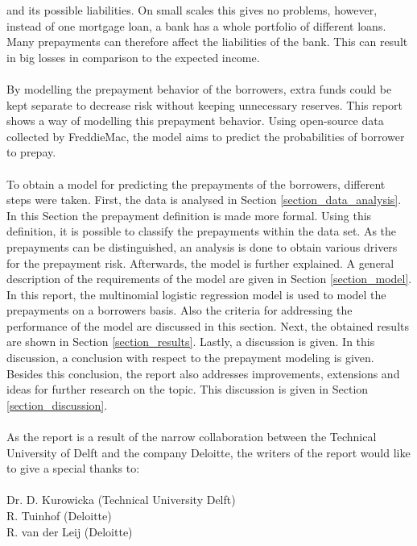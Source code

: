 and its possible liabilities. %
On small scales this gives no problems, however, instead of one 
mortgage loan, a bank has a whole portfolio of different loans. 
Many prepayments can therefore affect the liabilities of the bank. This 
can result in big losses in comparison to the expected income.  
\\\\
By modelling the prepayment behavior of the borrowers, extra funds could be 
kept separate to decrease risk without keeping unnecessary 
reserves. 
This report shows a way of modelling this prepayment behavior. 
Using open-source data collected by FreddieMac, the model aims to predict 
the probabilities of borrower to prepay. 
\\\\
To obtain a model for predicting the prepayments of the borrowers, 
different steps were taken.
First, the data is analysed in Section \ref{section_data_analysis}. In 
this Section the prepayment definition is made more formal. Using this 
definition, it is possible to classify the prepayments within the data set. 
As the prepayments can be distinguished, an analysis is done to obtain 
various drivers for the prepayment risk. Afterwards, the model is further 
explained. A general description of the requirements of the model are given in 
Section \ref{section_model}. In this report, the multinomial logistic regression 
model is used to model the prepayments on a borrowers basis. Also the criteria 
for addressing the performance of the model are discussed in this section.   
Next, the obtained results are shown in Section \ref{section_results}. Lastly, 
a discussion is given. In this discussion, a conclusion with respect to the 
prepayment modeling is given. Besides this conclusion, the report also addresses 
improvements, extensions and ideas for further research on the topic. 
This discussion is given in Section \ref{section_discussion}.
\\\\
As the report is a result of the narrow collaboration between the Technical 
University of Delft and the company Deloitte, the writers of the report would 
like to give a special thanks to:
\\\\
Dr. D. Kurowicka (Technical University Delft)  \\
R. Tuinhof (Deloitte)                           \\
R. van der Leij (Deloitte)
